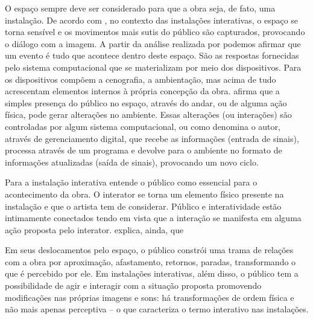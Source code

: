 O espaço sempre deve ser considerado para que a obra seja, de fato, uma instalação. De acordo com , no contexto das instalações interativas, o espaço se torna sensível e os movimentos mais sutis do público são capturados, provocando o diálogo com a imagem. A partir da análise realizada por  podemos afirmar que um evento é tudo que acontece dentro deste espaço. São as respostas fornecidas pelo sistema computacional que se materializam por meio dos dispositivos. Para  os dispositivos compõem a cenografia, a ambientação, mas acima de tudo acrescentam elementos internos à própria concepção da obra.  afirma que a simples presença do público no espaço, através do andar, ou de alguma ação física, pode gerar alterações no ambiente. Essas alterações (ou interações) são controladas por algum sistema computacional, ou como denomina o autor, através de gerenciamento digital, que recebe as informações (entrada de sinais), processa através de um programa e devolve para o ambiente no formato de informações atualizadas (saída de sinais), provocando um novo ciclo.

Para  a instalação interativa entende o público como essencial para o acontecimento da obra. O interator se torna um elemento físico presente na instalação e que o artista tem de considerar. Público e interatividade estão intimamente conectados tendo em vista que a interação se manifesta em alguma ação proposta pelo interator.  explica, ainda, que

\begin{citacao}
Em seus deslocamentos pelo espaço, o público constrói uma trama de relações com a obra por aproximação, afastamento, retornos, paradas, transformando o que é percebido por ele. Em instalações interativas, além disso, o público tem a possibilidade de agir e interagir com a situação proposta promovendo modificações nas próprias imagens e sons:  há transformações de ordem física e não mais apenas perceptiva – o que caracteriza o termo interativo nas instalações.  \cite[p. 6]{bochio}  
\end{citacao}

